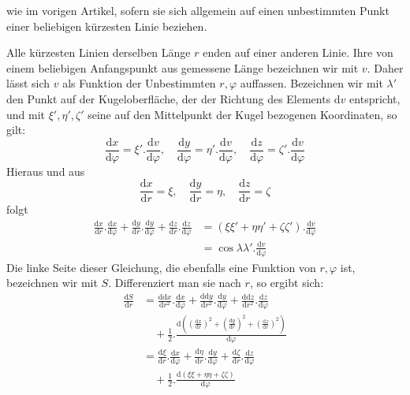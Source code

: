 %
wie im vorigen Artikel, sofern sie sich allgemein auf einen unbestimmten Punkt einer beliebigen kürzesten Linie beziehen.

Alle kürzesten Linien derselben Länge \(r\) enden auf einer anderen Linie. Ihre von einem beliebigen Anfangspunkt aus gemessene Länge bezeichnen wir mit \(v\). Daher lässt sich \(v\) als Funktion der Unbestimmten \(r,\varphi\) auffassen. Bezeichnen wir mit \(\lambda'\) den Punkt auf der Kugeloberfläche, der der Richtung des Elements \(\mathrm{d}v\) entspricht, und mit \(\xi',\eta',\zeta'\) seine auf den Mittelpunkt der Kugel bezogenen Koordinaten, so gilt:
\[
\frac{\mathrm{d}x}{\mathrm{d}\varphi}=\xi'\mathord{.}\frac{\mathrm{d}v}{\mathrm{d}\varphi},\quad
\frac{\mathrm{d}y}{\mathrm{d}\varphi}=\eta'\mathord{.}\frac{\mathrm{d}v}{\mathrm{d}\varphi},\quad
\frac{\mathrm{d}z}{\mathrm{d}\varphi}=\zeta'\mathord{.}\frac{\mathrm{d}v}{\mathrm{d}\varphi}
\]
Hieraus und aus
\[
\frac{\mathrm{d}x}{\mathrm{d}r}=\xi,\quad\frac{\mathrm{d}y}{\mathrm{d}r}=\eta,\quad\frac{\mathrm{d}z}{\mathrm{d}r}=\zeta
\]
folgt
\[
\begin{aligned}
\frac{\mathrm{d}x}{\mathrm{d}r}\mathord{.}\frac{\mathrm{d}x}{\mathrm{d}\varphi}+\frac{\mathrm{d}y}{\mathrm{d}r}\mathord{.}\frac{\mathrm{d}y}{\mathrm{d}\varphi}+\frac{\mathrm{d}z}{\mathrm{d}r}\mathord{.}\frac{\mathrm{d}z}{\mathrm{d}\varphi}
&=(\xi\xi'+\eta\eta'+\zeta\zeta')\mathord{.}\frac{\mathrm{d}v}{\mathrm{d}\varphi}\\
&=\cos\lambda\lambda'\mathord{.}\frac{\mathrm{d}v}{\mathrm{d}\varphi}
\end{aligned}
\]
Die linke Seite dieser Gleichung, die ebenfalls eine Funktion von \(r,\varphi\) ist, bezeichnen wir mit \(S\). Differenziert man sie nach \(r\), so ergibt sich:
\[
\begin{aligned}
\frac{\mathrm{d}S}{\mathrm{d}r}&=\frac{\mathrm{d}\mathrm{d}x}{\mathrm{d}r^2}\mathord{.}\frac{\mathrm{d}x}{\mathrm{d}\varphi}+\frac{\mathrm{d}\mathrm{d}y}{\mathrm{d}r^2}\mathord{.}\frac{\mathrm{d}y}{\mathrm{d}\varphi}+\frac{\mathrm{d}\mathrm{d}z}{\mathrm{d}r^2}\mathord{.}\frac{\mathrm{d}z}{\mathrm{d}\varphi}\\
&\quad+\tfrac{1}{2}\mathord{.}\frac{\mathrm{d}((\tfrac{\mathrm{d}x}{\mathrm{d}r})^2+(\tfrac{\mathrm{d}y}{\mathrm{d}r})^2+(\tfrac{\mathrm{d}z}{\mathrm{d}r})^2)}{\mathrm{d}\varphi}\\
&=\frac{\mathrm{d}\xi}{\mathrm{d}r}\mathord{.}\frac{\mathrm{d}x}{\mathrm{d}\varphi}+\frac{\mathrm{d}\eta}{\mathrm{d}r}\mathord{.}\frac{\mathrm{d}y}{\mathrm{d}\varphi}+\frac{\mathrm{d}\zeta}{\mathrm{d}r}\mathord{.}\frac{\mathrm{d}z}{\mathrm{d}\varphi}\\
&\quad+\tfrac{1}{2}\mathord{.}\frac{\mathrm{d}(\xi\xi+\eta\eta+\zeta\zeta)}{\mathrm{d}\varphi}
\end{aligned}
\]
